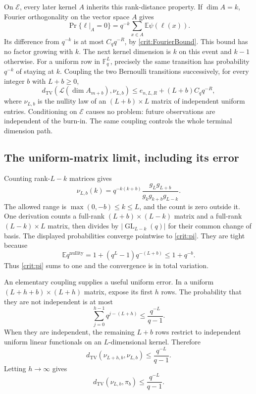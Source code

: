 On $\mathcal E$, every later kernel $A$ inherits this rank-distance
property. If $\dim A=k$, Fourier orthogonality on the vector space $A$
gives
\[
 \Pr\{\ell|_A=0\}
 =q^{-k}\sum_{x\in A}\mathbb E\psi(\ell(x)).
\]
Its difference from $q^{-k}$ is at most $C_qq^{-R}$, by
\eqref{crit:FourierBound}. This bound has no factor growing with $k$.
The next kernel dimension is $k$ on this event and $k-1$ otherwise.
For a uniform row in $\mathbb F_q^L$, precisely the same transition
has probability $q^{-k}$ of staying at $k$. Coupling the two Bernoulli
transitions successively, for every integer $b$ with $L+b\ge0$,
\begin{equation}\label{crit:coupling}
 d_{\mathrm{TV}}\!\left(
 \mathcal L(\dim A_{m+b}),\nu_{L,b}\right)
 \le e_{n,L,R}+(L+b)C_qq^{-R},
\end{equation}
where $\nu_{L,b}$ is the nullity law of an $(L+b)\times L$ matrix
of independent uniform entries. Conditioning on $\mathcal E$ causes
no problem: future observations are independent of the burn-in.
The same coupling controls the whole terminal dimension path.

\subsection{The uniform-matrix limit, including its error}

Counting rank-$L-k$ matrices gives
\[
 \nu_{L,b}(k)=q^{-k(k+b)}
 \frac{g_Lg_{L+b}}{g_kg_{k+b}g_{L-k}}.
\]
The allowed range is $\max(0,-b)\le k\le L$, and the count is zero
outside it. One derivation counts a full-rank $(L+b)\times(L-k)$
matrix and a full-rank $(L-k)\times L$ matrix, then divides by
$|\operatorname{GL}_{L-k}(q)|$ for their common change of basis.
The displayed probabilities converge pointwise to \eqref{crit:pi}.
They are tight because
\[
 \mathbb E q^{\operatorname{nullity}}=1+(q^L-1)q^{-(L+b)}
 \le1+q^{-b}.
\]
Thus \eqref{crit:pi} sums to one and the convergence is in total
variation.

An elementary coupling supplies a useful uniform error. In a uniform
$(L+h+b)\times(L+h)$ matrix, expose its first $h$ rows. The probability
that they are not independent is at most
\[
 \sum_{j=0}^{h-1}q^{j-(L+h)}\le\frac{q^{-L}}{q-1}.
\]
When they are independent, the remaining $L+b$ rows restrict to
independent uniform linear functionals on an $L$-dimensional kernel.
Therefore
\[
 d_{\mathrm{TV}}(\nu_{L+h,b},\nu_{L,b})\le\frac{q^{-L}}{q-1}.
\]
Letting $h\to\infty$ gives
\begin{equation}\label{crit:uniformError}
 d_{\mathrm{TV}}(\nu_{L,b},\pi_b)\le\frac{q^{-L}}{q-1}.
\end{equation}


